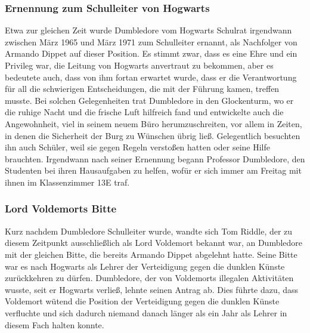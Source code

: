 \documentclass[a4paper, 10pt]{article}
\begin{document}
\subsubsection*{Ernennung zum Schulleiter von Hogwarts}
Etwa zur gleichen Zeit wurde Dumbledore vom Hogwarts Schulrat irgendwann zwischen März 1965 und März 1971 zum Schulleiter ernannt, als Nachfolger von Armando Dippet auf dieser Position. Es stimmt zwar, dass es eine Ehre und ein Privileg war, die Leitung von Hogwarts anvertraut zu bekommen, aber es bedeutete auch, dass von ihm fortan erwartet wurde, dass er die Verantwortung für all die schwierigen Entscheidungen, die mit der Führung kamen, treffen musste. Bei solchen Gelegenheiten trat Dumbledore in den Glockenturm, wo er die ruhige Nacht und die frische Luft hilfreich fand und entwickelte auch die Angewohnheit, viel in seinem neuem Büro herumzuschreiten, vor allem in Zeiten, in denen die Sicherheit der Burg zu Wünschen übrig ließ. Gelegentlich besuchten ihn auch Schüler, weil sie gegen Regeln verstoßen hatten oder seine Hilfe brauchten. Irgendwann nach seiner Ernennung begann Professor Dumbledore, den Studenten bei ihren Hausaufgaben zu helfen, wofür er sich immer am Freitag mit ihnen im Klassenzimmer 13E traf.
\subsubsection*{Lord Voldemorts Bitte}
Kurz nachdem Dumbledore Schulleiter wurde, wandte sich Tom Riddle, der zu diesem Zeitpunkt ausschließlich als Lord Voldemort bekannt war, an Dumbledore mit der gleichen Bitte, die bereits Armando Dippet abgelehnt hatte. Seine Bitte war es nach Hogwarts als Lehrer der Verteidigung gegen die dunklen Künste zurückkehren zu dürfen. Dumbledore, der von Voldemorts illegalen Aktivitäten wusste, seit er Hogwarts verließ, lehnte seinen Antrag ab. Dies führte dazu, dass Voldemort wütend die Position der Verteidigung gegen die dunklen Künste verfluchte und sich dadurch niemand danach länger als ein Jahr als Lehrer in diesem Fach halten konnte.
\end{document}

